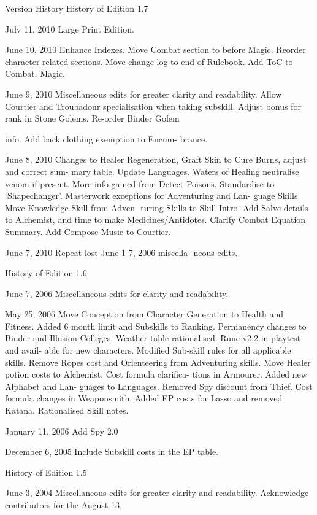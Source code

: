 \begin{Chapter}{Version History}
History of Edition 1.7 

July 11, 2010 Large Print Edition. 

June  10,  2010  Enhance  Indexes.  Move  Combat 
section  to  before  Magic.  Reorder  character-related 
sections.  Move  change  log  to  end  of  Rulebook. 
Add ToC to Combat, Magic. 

June 9, 2010 Miscellaneous edits for greater clarity 
and  readability.  Allow  Courtier  and  Troubadour 
specialisation  when  taking  subskill.  Adjust  bonus 
for rank in Stone Golems. Re-order  Binder Golem 

info.  Add  back  clothing  exemption  to  Encum-
brance. 

June  8,  2010  Changes  to  Healer  Regeneration, 
Graft  Skin to  Cure  Burns,  adjust  and  correct  sum-
mary  table.  Update  Languages.  Waters  of  Healing 
neutralise venom if present. More info gained from 
Detect  Poisons.  Standardise  to  ‘Shapechanger’. 
Masterwork  exceptions  for  Adventuring  and  Lan-
guage Skills. Move Knowledge Skill from Adven-
turing  Skills  to  Skill  Intro.  Add  Salve  details  to 
Alchemist, and time to make Medicines/Antidotes. 
Clarify Combat Equation Summary. Add Compose 
Music to Courtier. 

June  7,  2010  Repeat  lost  June  1-7, 2006  miscella-
neous edits. 

History of Edition 1.6 

June  7,  2006  Miscellaneous  edits  for  clarity  and 
readability. 

May  25,  2006  Move  Conception  from  Character 
Generation  to  Health  and  Fitness.  Added  6  month 
limit  and  Subskills 
to  Ranking.  Permanency 
changes  to  Binder  and  Illusion  Colleges.  Weather 
table rationalised. Rune v2.2 in playtest and avail-
able  for  new  characters.  Modified  Sub-skill  rules 
for  all  applicable  skills.    Remove  Ropes  cost  and 
Orienteering from Adventuring skills. Move Healer 
potion  costs  to  Alchemist.  Cost  formula  clarifica-
tions in  Armourer.  Added  new  Alphabet  and  Lan-
guages to Languages. Removed Spy discount from 
Thief.  Cost  formula  changes  in  Weaponsmith. 
Added  EP  costs  for  Lasso  and  removed  Katana. 
Rationalised Skill notes. 

January 11, 2006 Add Spy 2.0 

December 6, 2005 Include Subskill costs in the EP 
table. 

History of Edition 1.5 

June 3, 2004 Miscellaneous edits for greater clarity 
and  readability.  Acknowledge  contributors  for  the 
August 13, 


\end{Chapter}
